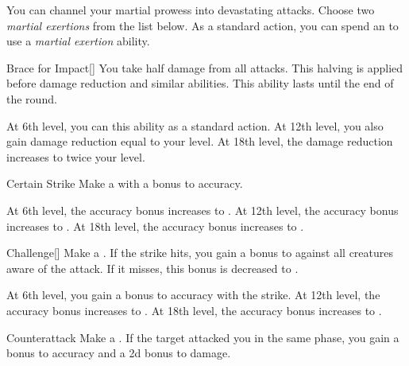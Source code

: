         You can channel your martial prowess into devastating attacks.
        Choose two \textit{martial exertions} from the list below.
        As a standard action, you can spend an  to use a \textit{martial exertion} ability.
        {
            \begin{ability}{Brace for Impact}[]
                You take half damage from all attacks.
                This halving is applied before damage reduction and similar abilities.
                This ability lasts until the end of the round.

                At 6th level, you can  this ability as a standard action.
                At 12th level, you also gain damage reduction equal to your level.
                At 18th level, the damage reduction increases to twice your level.
            \end{ability}

            \begin{ability}{Certain Strike}
                Make a  with a  bonus to accuracy.

                At 6th level, the accuracy bonus increases to .
                At 12th level, the accuracy bonus increases to .
                At 18th level, the accuracy bonus increases to .
            \end{ability}

            \begin{ability}{Challenge}[]
                Make a .
                If the strike hits, you gain a  bonus to  against all creatures aware of the attack.
                If it misses, this bonus is decreased to .

                At 6th level, you gain a  bonus to accuracy with the strike.
                At 12th level, the accuracy bonus increases to .
                At 18th level, the accuracy bonus increases to .
            \end{ability}

            \begin{ability}{Counterattack}
                Make a .
                If the target attacked you in the same phase, you gain a  bonus to accuracy and a \plus2d bonus to damage.


\end{ability}}
